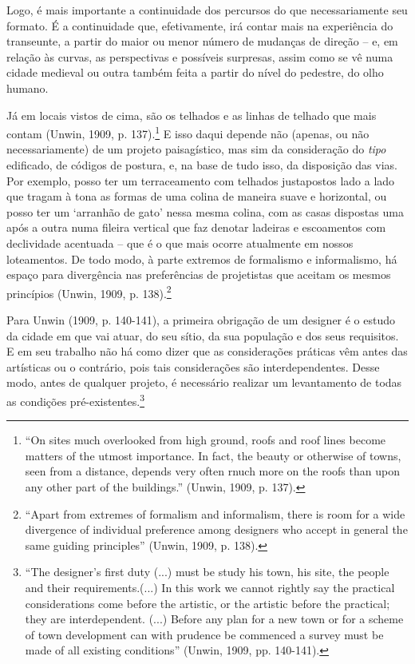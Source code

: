 \documentclass[12pt, a4paper]{book} %
\begin{document}
        Logo, é mais importante a continuidade dos percursos do que necessariamente seu formato. É a continuidade que, efetivamente, irá contar mais na experiência do transeunte, a partir do maior ou menor número de mudanças de direção – e, em relação às curvas, as perspectivas e possíveis surpresas, assim como se vê numa cidade medieval ou outra também feita a partir do nível do pedestre, do olho humano.

        Já em locais vistos de cima, são os telhados e as linhas de telhado que mais contam (Unwin, 1909, p. 137).\footnote[26]{``On sites much overlooked from high ground, roofs and roof lines become matters of the utmost importance. In fact, the beauty or otherwise of towns, seen from a distance, depends very often rnuch more on the roofs than upon any other part of the buildings.'' (Unwin, 1909, p. 137).} E isso daqui depende não (apenas, ou não necessariamente) de um projeto paisagístico, mas sim da consideração do \textit{tipo} edificado, de códigos de postura, e, na base de tudo isso, da disposição das vias. Por exemplo, posso ter um terraceamento com telhados justapostos lado a lado que tragam à tona as formas de uma colina de maneira suave e horizontal, ou posso ter um `arranhão de gato' nessa mesma colina, com as casas dispostas uma após a outra numa fileira vertical que faz denotar ladeiras e escoamentos com declividade acentuada – que é o que mais ocorre atualmente em nossos loteamentos. De todo modo, à parte extremos de formalismo e informalismo, há espaço para divergência nas preferências de projetistas que aceitam os mesmos princípios (Unwin, 1909, p. 138).\footnote[27]{``Apart from extremes of formalism and informalism, there is room for a wide divergence of individual preference among designers who accept in general the same guiding principles'' (Unwin, 1909, p. 138).}

        Para Unwin (1909, p. 140-141), a primeira obrigação de um designer é o estudo da cidade em que vai atuar, do seu sítio, da sua população e dos seus requisitos. E em seu trabalho não há como dizer que as considerações práticas vêm antes das artísticas ou o contrário, pois tais considerações são interdependentes. Desse modo, antes de qualquer projeto, é necessário realizar um levantamento de todas as condições pré-existentes.\footnote[28]{``The designer's first duty (...) must be study his town, his site, the people and their requirements.(...) In this work we cannot rightly say the practical considerations come before the artistic, or the artistic before the practical; they are interdependent. (...) Before any plan for a new town or for a scheme of town development can with prudence be commenced a survey must be made of all existing conditions'' (Unwin, 1909, pp. 140-141).}
\end{document}
